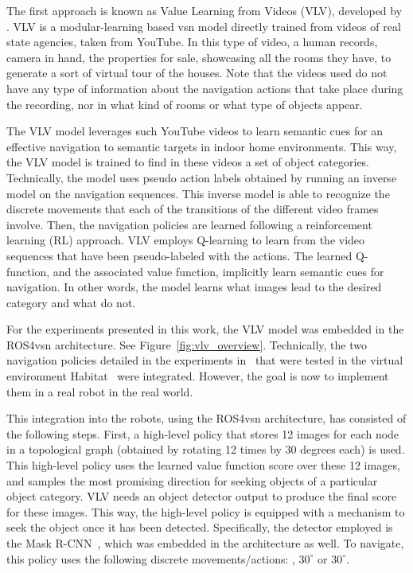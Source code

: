 The first approach is known as Value Learning from Videos (\textsc{VLV}), developed by \cite{chang2020}.
VLV is a modular-learning based \acrshort{vsn} model directly trained from videos of real state agencies, taken from YouTube.
In this type of video, a human records, camera in hand, the properties for sale, showcasing all the rooms they have, to generate a sort of virtual tour of the houses.
Note that the videos used do not have any type of information about the navigation actions that take place during the recording, nor in what kind of rooms or what type of objects appear.

The VLV model leverages such YouTube videos to learn semantic cues for an effective navigation to semantic targets in indoor home environments.
This way, the VLV model is trained to find in these videos a set of object categories.
Technically, the model uses pseudo action labels obtained by running an inverse model on the navigation sequences.
This inverse model is able to recognize the discrete movements that each of the transitions of the different video frames involve.
Then, the navigation policies are learned following a reinforcement learning (RL) approach.
VLV employs Q-learning to learn from the video sequences that have been pseudo-labeled with the actions.
The learned Q-function, and the associated value function, implicitly learn semantic cues for navigation.
In other words, the model learns what images lead to the desired category and what do not.

For the experiments presented in this work, the VLV model was embedded in the ROS4\acrshort{vsn} architecture.
See Figure~\ref{fig:vlv_overview}.
Technically, the two navigation policies detailed in the experiments in~\cite{chang2020} that were tested in the virtual environment Habitat~\cite{NEURIPS2021_021bbc7e} were integrated.
However, the goal is now to implement them in a real robot in the real world.

This integration into the robots, using the ROS4\acrshort{vsn} architecture, has consisted of the following steps.
First, a high-level policy that stores 12 images for each node in a topological graph (obtained by rotating 12 times by 30 degrees each) is used.
This high-level policy uses the learned value function score over these 12 images, and samples the most promising direction for seeking objects of a particular object category.
VLV needs an object detector output to produce the final score for these images.
This way, the high-level policy is equipped with a mechanism to seek the object once it has been detected.
Specifically, the detector employed is the Mask R-CNN~\cite{mask-rcnn}, which was embedded in the architecture as well.
To navigate, this policy uses the following discrete movements/actions: \moveforward 25cm, \turnright $30^\circ$ or \turnleft $30^\circ$.

